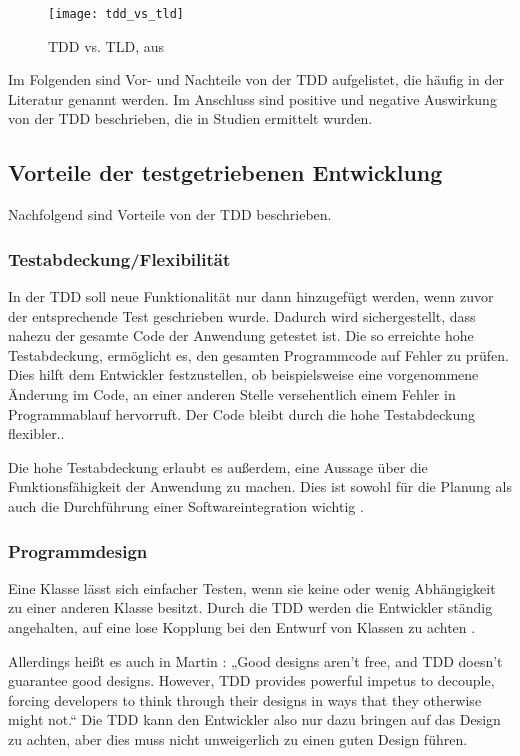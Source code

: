 \begin{figure*}[tbh]
\centering
\texttt{[image: tdd\_vs\_tld]}
\caption{TDD vs. TLD, aus \cite{Munir2014ConsideringReview}}
\label{fig:TDDvsTLD}
\end{figure*}

Im Folgenden sind Vor- und Nachteile von der TDD aufgelistet, die häufig in der Literatur genannt werden. Im Anschluss sind positive und negative Auswirkung von der TDD beschrieben, die in Studien ermittelt wurden.

\subsection{Vorteile der testgetriebenen Entwicklung}  \label{sec:tddVorteile}
Nachfolgend sind Vorteile von der TDD beschrieben.

\subsubsection{Testabdeckung/Flexibilität} In der TDD soll neue Funktionalität nur dann hinzugefügt werden, wenn zuvor der entsprechende Test geschrieben wurde. Dadurch wird sichergestellt, dass nahezu der gesamte Code der Anwendung getestet ist. Die so erreichte hohe Testabdeckung, ermöglicht es, den gesamten Programmcode auf Fehler zu prüfen. Dies hilft dem Entwickler festzustellen, ob beispielsweise eine vorgenommene Änderung im Code, an einer anderen Stelle versehentlich einem Fehler in Programmablauf hervorruft. Der Code bleibt durch die hohe Testabdeckung flexibler.\cite{Martin2007ProfessionalismDevelopment, Janzen2005Test-drivenDirection}.

Die hohe Testabdeckung erlaubt es außerdem, eine Aussage über die Funktionsfähigkeit der Anwendung zu machen. Dies ist sowohl für die Planung als auch die Durchführung einer Softwareintegration wichtig \cite{Link2005SoftwaretestsEntwicklung}.

\subsubsection{Programmdesign} Eine Klasse lässt sich einfacher Testen, wenn sie keine oder wenig Abhängigkeit zu einer anderen Klasse besitzt. Durch die TDD werden die Entwickler ständig angehalten, auf eine lose Kopplung bei den Entwurf von Klassen zu achten \cite{Martin2007ProfessionalismDevelopment, Link2005SoftwaretestsEntwicklung,Yahya2015TheDevelopment}.

Allerdings heißt es auch in Martin \cite[S. 35]{Martin2007ProfessionalismDevelopment}: „Good designs aren’t free, and TDD doesn’t guarantee good designs. However, TDD provides powerful impetus to decouple, forcing developers to think through their designs in ways that they otherwise might not.“ Die TDD kann den Entwickler also nur dazu bringen auf das Design zu achten, aber dies muss nicht unweigerlich zu einen guten Design führen.

